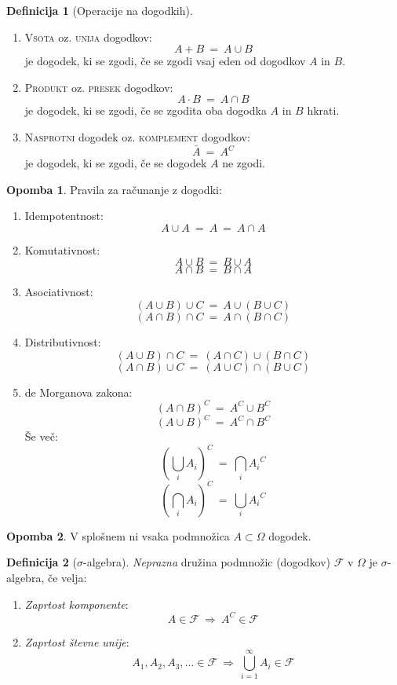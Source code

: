 \documentclass[11pt]{article}
\theoremstyle{definition}
\newtheorem{definicija}{Definicija}[section]
\theoremstyle{definition}
\theoremstyle{definition}
\newtheorem*{opomba}{Opomba}
\begin{document}
\begin{definicija}[Operacije na dogodkih]
~
\begin{enumerate}
	\item \textsc{Vsota} oz. \textsc{unija} dogodkov:
	$$A + B ~=~ A \cup B$$
	je dogodek, ki se zgodi, če se zgodi vsaj eden od dogodkov $A$ in $B$. \\
	\item \textsc{Produkt} oz. \textsc{presek} dogodkov:
	$$A \cdot B ~=~ A \cap B$$
	je dogodek, ki se zgodi, če se zgodita oba dogodka $A$ in $B$ hkrati.
	\item \textsc{Nasprotni} dogodek oz. \textsc{komplement} dogodkov:
	$$\bar{A} ~=~ A^C$$
	je dogodek, ki se zgodi, če se dogodek $A$ ne zgodi.
\end{enumerate}
\end{definicija}
\vspace{0.5cm}

\begin{opomba}

Pravila za računanje z dogodki:
\begin{enumerate}
	\item Idempotentnost: 
	$$A \cup A ~=~ A ~=~ A \cap A$$
	\item Komutativnost:
	$$A \cup B ~=~ B \cup A$$
	$$A \cap B ~=~ B \cap A$$
	\item Asociativnost:
	$$(A \cup B) \cup C ~=~ A \cup (B \cup C)$$
	$$(A \cap B) \cap C ~=~ A \cap (B \cap C)$$
	\item Distributivnost:
	$$(A \cup B) \cap C ~=~ (A \cap C) \cup (B \cap C)$$
	$$(A \cap B) \cup C ~=~ (A \cup C) \cap (B \cup C)$$
	\item de Morganova zakona:
	$$(A \cap B)^C ~=~ A^C \cup B^C$$
	$$(A \cup B)^C ~=~ A^C \cap B^C$$
	Še več:
	$$\left( \bigcup_i A_i \right)^C ~=~ \bigcap_i {A_i}^C$$
	$$\left( \bigcap_i A_i \right)^C ~=~ \bigcup_i {A_i}^C$$
\end{enumerate}
\end{opomba}
\vspace{0.5cm}

\begin{opomba}

V splošnem ni vsaka podmnožica $A \subset \Omega$ dogodek.

\end{opomba}
\vspace{0.5cm}

\begin{definicija}[$\sigma$-algebra]

\textit{Neprazna} družina podmnožic (dogodkov) $\mathcal{F}$ v $\Omega$ je $\sigma$-algebra, če velja:
\begin{enumerate}
	\item \textit{Zaprtost komponente}:
	$$A \in \mathcal{F} ~\Rightarrow~ A^C \in \mathcal{F}$$
	\item \textit{Zaprtost števne unije}:
	$$A_1, A_2, A_3, \ldots \in \mathcal{F} ~\Rightarrow~ \bigcup_{i=1}^{\infty} A_i \in \mathcal{F}$$
\end{enumerate}
\end{definicija}
\vspace{0.5cm}
\end{document}
